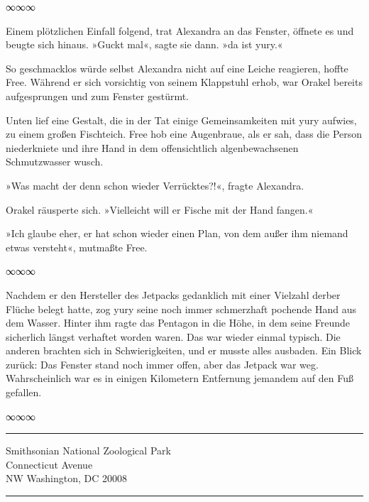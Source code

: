 \begin{center}
∞∞∞
\end{center}

Einem plötzlichen Einfall folgend, trat Alexandra an das Fenster, öffnete es und beugte sich hinaus. »Guckt mal«, sagte sie dann. »da ist yury.«

So geschmacklos würde selbst Alexandra nicht auf eine Leiche reagieren, hoffte Free. Während er sich vorsichtig von seinem Klappstuhl erhob, war Orakel bereits aufgesprungen und zum Fenster gestürmt.

Unten lief eine Gestalt, die in der Tat einige Gemeinsamkeiten mit yury aufwies, zu einem großen Fischteich. Free hob eine Augenbraue, als er sah, dass die Person niederkniete und ihre Hand in dem offensichtlich algenbewachsenen Schmutzwasser wusch.

»Was macht der denn schon wieder Verrücktes?!«, fragte Alexandra.

Orakel räusperte sich. »Vielleicht will er Fische mit der Hand fangen.«

»Ich glaube eher, er hat schon wieder einen Plan, von dem außer ihm niemand etwas versteht«, mutmaßte Free.

\begin{center}
∞∞∞
\end{center}

Nachdem er den Hersteller des Jetpacks gedanklich mit einer Vielzahl derber Flüche belegt hatte, zog yury seine noch immer schmerzhaft pochende Hand aus dem Wasser. Hinter ihm ragte das Pentagon in die Höhe, in dem seine Freunde sicherlich längst verhaftet worden waren. Das war wieder einmal typisch. Die anderen brachten sich in Schwierigkeiten, und er musste alles ausbaden. Ein Blick zurück: Das Fenster stand noch immer offen, aber das Jetpack war weg. Wahrscheinlich war es in einigen Kilometern Entfernung jemandem auf den Fuß gefallen.

\begin{center}
∞∞∞
\end{center}

\noindent \parbox{\textwidth}{ \vspace{3ex} \hrule \vspace{3ex}

    \begin{footnotesize}
    \begin{ttfamily}

\noindent Smithsonian National Zoological Park\\
 Connecticut Avenue\\
\noindent NW Washington, DC 20008

    \end{ttfamily}
    \end{footnotesize}

\vspace{3ex} \hrule \vspace{3ex} }


